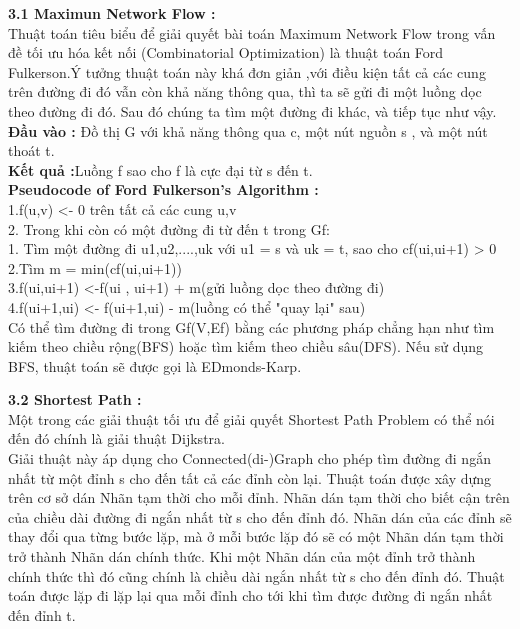 \documentclass{article}
\begin{document}
	\begin{flushleft}
		\fontsize{14pt}{22pt}\selectfont
		\textbf{3.1 Maximun Network Flow :}\\
		\hspace{0.86cm}Thuật toán tiêu biểu để giải quyết bài toán Maximum Network Flow trong vấn đề tối ưu hóa kết nối (Combinatorial Optimization) là thuật toán Ford Fulkerson.Ý tưởng thuật toán này khá đơn giản ,với điều kiện tất cả các cung trên đường đi đó vẫn còn khả năng thông qua, thì ta sẽ gửi đi một luồng dọc theo đường đi đó. Sau đó chúng ta tìm một đường đi khác, và tiếp tục như vậy.\\
		\hspace{0.5cm} \textbf{Đầu vào :} Đồ thị G với khả năng thông qua c, một nút nguồn s , và một nút thoát t.\\
		\hspace{0.5cm} \textbf{Kết quả :}Luồng f sao cho f là cực đại từ s đến t.\\
		\hspace{0.86cm}\textbf{Pseudocode of Ford Fulkerson's Algorithm :}\\
		1.f(u,v) <- 0 trên tất cả các cung u,v\\
		2. Trong khi còn có một đường đi từ đến t trong Gf:\\
		\hspace{0.5cm}1. Tìm một đường đi u1,u2,....,uk với u1 = s và uk = t, sao cho cf(ui,ui+1) > 0\\
		\hspace{0.5cm}2.Tìm m = min(cf(ui,ui+1))\\
		\hspace{0.5cm}3.f(ui,ui+1) <-f(ui , ui+1) + m(gửi luồng dọc theo đường đi)\\
		\hspace{0.5cm}4.f(ui+1,ui) <- f(ui+1,ui) - m(luồng có thể "quay lại" sau)\\	
		Có thể tìm đường đi trong Gf(V,Ef) bằng các phương pháp chẳng hạn như tìm kiếm theo chiều rộng(BFS) hoặc tìm kiếm theo chiều sâu(DFS). Nếu sử dụng BFS, thuật toán sẽ được gọi là EDmonds-Karp.
	\end{flushleft}
	\begin{flushleft}
		\fontsize{14pt}{22pt}\selectfont
		\textbf{3.2 Shortest Path :}\\
			\hspace{0.86cm}Một trong các giải thuật tối ưu để giải quyết Shortest Path Problem có thể nói đến đó chính là giải thuật Dijkstra.\\
			\hspace{0.86cm}Giải thuật này áp dụng cho Connected(di-)Graph cho phép tìm đường đi ngắn nhất từ một đỉnh s cho đến tất cả các đỉnh còn lại. Thuật toán được xây dựng trên cơ sở dán Nhãn tạm thời cho mỗi đỉnh. Nhãn dán tạm thời cho biết cận trên của chiều dài đường đi ngắn nhất từ s cho đến đỉnh đó. Nhãn dán của các đỉnh sẽ thay đổi qua từng bước lặp, mà ở mỗi bước lặp đó sẽ có một Nhãn dán tạm thời trở thành Nhãn dán chính thức. Khi một Nhãn dán của một đỉnh trở thành chính thức thì đó cũng chính là chiều dài ngắn nhất từ s cho đến đỉnh đó. Thuật toán được lặp đi lặp lại qua mỗi đỉnh cho tới khi tìm được đường đi ngắn nhất đến đỉnh t.\\
	\end{flushleft}
\end{document}

